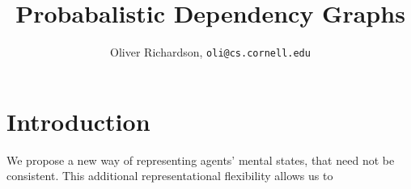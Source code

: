\documentclass{article}
\title{Probabalistic Dependency Graphs}
\author{Oliver Richardson,  \texttt{oli@cs.cornell.edu}}
\begin{document}
	\maketitle
	
	\section{Introduction}
	
	 We propose a new way of representing agents' mental states, that need not be consistent. This additional representational flexibility allows us to 
	 
	 
	
\end{document}
